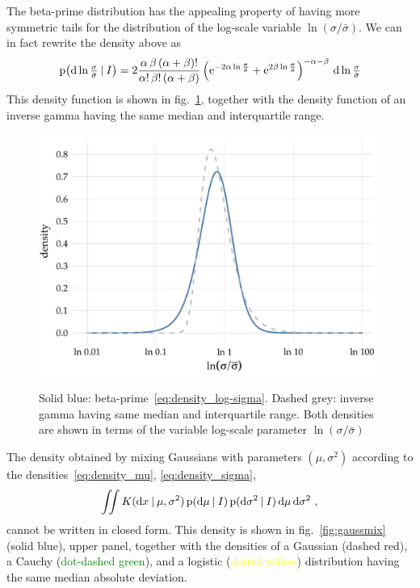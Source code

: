 \documentclass[\ifafour a4paper,12pt,\else a5paper,10pt,\fi%
onecolumn,oneside,article,%
british%
]{memoir}
\makeatletter
\theoremstyle{remark}
\theoremstyle{innote}
\def\sum{\DOTSI\sumop\slimits@}
\newcommand*{\e}{\ensuremath{\mathrm{e}}}
\newcommand*{\di}{\mathrm{d}}%
\newcommand*{\p}{\mathrm{p}}%
\renewcommand*{\|}[1][]{\nonscript\:#1\vert\nonscript\:\mathopen{}}
\newcommand*{\fig}{fig.}%
\newcommand*{\sigmao}{\bar{\sigma}}
\newcommand*{\shapeh}{\alpha}
\newcommand*{\shapel}{\beta}
\makeatother
\begin{document}
The beta-prime distribution has the appealing property of having more symmetric tails for the distribution of the log-scale variable $\ln(\sigma/\sigmao)$. We can in fact rewrite the density above as
\begin{equation}
  \label{eq:density_log-sigma}
    \p\bigl(\di \ln\tfrac{\sigma}{\sigmao}\|I\bigr) =
    2\frac{\shapeh\,\shapel\, (\shapeh+\shapel)!}{\shapeh!\,\shapel!\,(\shapeh+\shapel)}
    \,\Bigl(
    \e^{-2\shapeh\ln\frac{\sigma}{\sigmao}}
+    \e^{2\shapel\ln\frac{\sigma}{\sigmao}}
    \Bigr)^{-\shapeh-\shapel}\ \di\ln\tfrac{\sigma}{\sigmao}
\end{equation}
This density function is shown in \fig~\ref{fig:betaprime}, together with the density function of an inverse gamma having the same median and interquartile range.
\begin{figure}
\centering\includegraphics[width=0.75\linewidth]{betaprime_invgamma.pdf}\\
\caption{Solid blue: beta-prime~\eqref{eq:density_log-sigma}. Dashed grey: inverse gamma having same median and interquartile range. Both densities are shown in terms of the variable log-scale parameter $\ln(\sigma/\sigmao)$}\label{fig:betaprime}
\end{figure}

\medskip

The density obtained by mixing Gaussians with parameters $(\mu, \sigma^{2})$ according to the densities~\eqref{eq:density_mu}, \eqref{eq:density_sigma},
\begin{equation}
  \label{eq:gaussian_mixture}
  \iint K(\di x \| \mu, \sigma^{2})\, \p(\di\mu \|I)\, \p(\di\sigma^{2} \|I)\,\di\mu\,\di\sigma^{2} \ ,
\end{equation}
cannot be written in closed form. This density is shown in \fig~\ref{fig:gaussmix} (\textcolor{bluepurple}{solid blue}), upper panel, together with the densities of a Gaussian (\textcolor{redpurple}{dashed red}), a Cauchy (\textcolor{green}{dot-dashed green}), and a logistic (\textcolor{yellow}{dotted yellow}) distribution having the same median absolute deviation.
\end{document}
